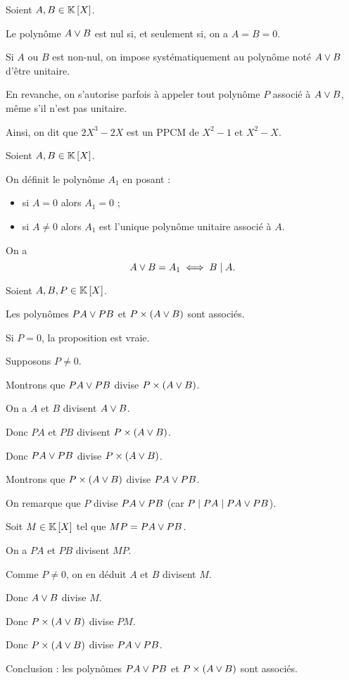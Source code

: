 \begin{rem}
Soient \(A,B\in\poly\).

Le polynôme \(A\lor B\) est nul si, et seulement si, on a \(A=B=0\).

Si \(A\) ou \(B\) est non-nul, on impose systématiquement au polynôme noté \(A\lor B\) d'être unitaire.

En revanche, on s'autorise parfois à appeler  tout polynôme \(P\) associé à \(A\lor B\), même s'il n'est pas unitaire.

Ainsi, on dit que \(2X^3-2X\) est un PPCM de \(X^2-1\) et \(X^2-X\).
\end{rem}

\begin{rem}
Soient \(A,B\in\poly\).

On définit le polynôme \(A_1\) en posant : \begin{itemize}
\item si \(A=0\) alors \(A_1=0\) ;

\item si \(A\not=0\) alors \(A_1\) est l'unique polynôme unitaire associé à \(A\). \\
\end{itemize}

On a \[A\lor B=A_1\iff B\mid A.\]
\end{rem}

\begin{prop}
Soient \(A,B,P\in\poly\).

Les polynômes \(PA\lor PB\) et \(P\times\left(A\lor B\right)\) sont associés.
\end{prop}

\begin{dem}
Si \(P=0\), la proposition est vraie.

Supposons \(P\not=0\).

Montrons que \(PA\lor PB\) divise \(P\times\left(A\lor B\right)\).

On a \(A\) et \(B\) divisent \(A\lor B\).

Donc \(PA\) et \(PB\) divisent \(P\times\left(A\lor B\right)\).

Donc \(PA\lor PB\) divise \(P\times\left(A\lor B\right)\).

Montrons que \(P\times\left(A\lor B\right)\) divise \(PA\lor PB\).

On remarque que \(P\) divise \(PA\lor PB\) (car \(P\mid PA\mid PA\lor PB\)).

Soit \(M\in\poly\) tel que \(MP=PA\lor PB\).

On a \(PA\) et \(PB\) divisent \(MP\).

Comme \(P\not=0\), on en déduit \(A\) et \(B\) divisent \(M\).

Donc \(A\lor B\) divise \(M\).

Donc \(P\times\left(A\lor B\right)\) divise \(PM\).

Donc \(P\times\left(A\lor B\right)\) divise \(PA\lor PB\).

Conclusion : les polynômes \(PA\lor PB\) et \(P\times\left(A\lor B\right)\) sont associés.
\end{dem}

